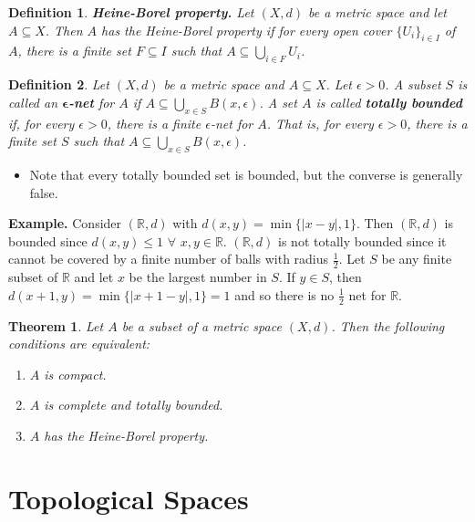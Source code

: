 \documentclass[two column]{article}
\newtheorem{theorem}{Theorem}[subsection]
\newtheorem{definition}{Definition}[subsection]
\begin{document}
\begin{definition}
{\bf Heine-Borel property.} Let $(X,d)$ be a metric space and let $A \subseteq X$. Then $A$ has the Heine-Borel property if for every open cover $\{ U_{i} \}_{i \in I}$ of $A$, there is a finite set $F \subseteq I$ such that $A \subseteq \bigcup_{i \in F} U_{i}$. \\
\end{definition} 

\begin{definition}
Let $(X,d)$ be a metric space and $A \subseteq X$. Let $\epsilon > 0$. A subset $S$ is called an $\boldsymbol{\epsilon}${\bf-net} for $A$ if $A \subseteq \bigcup_{x \in S} B(x,\epsilon)$. A set $A$ is called {\bf totally bounded} if, for every $\epsilon > 0$, there is a finite $\epsilon$-net for $A$. That is, for every $\epsilon > 0$, there is a finite set $S$ such that $A \subseteq \bigcup_{x \in S} B(x, \epsilon)$. 
\end{definition}
\begin{itemize}
\item Note that every totally bounded set is bounded, but the converse is generally false. \vspace{6pt}
\end{itemize}

{\bf Example.} Consider $(\mathbb{R},d)$ with $d(x,y) = \min \{ \lvert x - y \rvert, 1 \}$. Then $(\mathbb{R},d)$ is bounded since $d(x,y) \leq 1$ $\forall$ $x,y \in \mathbb{R}$. $(\mathbb{R},d)$ is not totally bounded since it cannot be covered by a finite number of balls with radius $\frac{1}{2}$. Let $S$ be any finite subset of $\mathbb{R}$ and let $x$ be the largest number in $S$. If $y \in S$, then $d(x+1,y) = \min \{ \lvert x +1 - y \rvert, 1 \} = 1$ and so there is no $\frac{1}{2}$ net for $\mathbb{R}$. \\

\begin{theorem} \label{charact. of compactness}
Let $A$ be a subset of a metric space $(X,d)$. Then the following conditions are equivalent:
\begin{enumerate}
\item $A$ is compact.
\item $A$ is complete and totally bounded. 
\item $A$ has the Heine-Borel property. 
\end{enumerate}
\end{theorem}

\section{Topological Spaces} 
\end{document}
